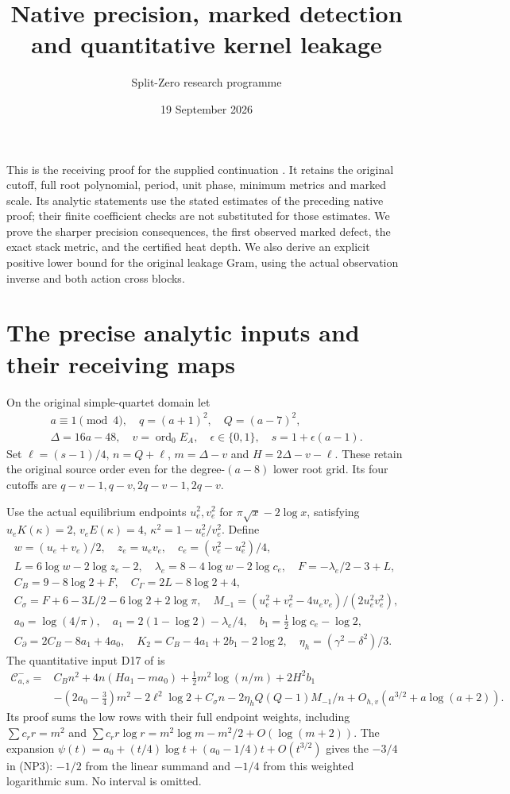 \documentclass[11pt]{article}
\title{Native precision, marked detection and quantitative kernel leakage}
\author{Split-Zero research programme}
\date{19 September 2026}
\begin{document}
\maketitle
This is the receiving proof for the supplied continuation
\cite{incoming}. It retains the original cutoff, full root polynomial,
period, unit phase, minimum metrics and marked scale. Its analytic
statements use the stated estimates of the preceding native proof;
their finite coefficient checks are not substituted for those estimates.
We prove the sharper precision consequences, the first observed marked
defect, the exact stack metric, and the certified heat depth. We also
derive an explicit positive lower bound for the original leakage Gram,
using the actual observation inverse and both action cross blocks.

\section{The precise analytic inputs and their receiving maps}
On the original simple-quartet domain let
\[
\begin{gathered}
 a\equiv1\pmod4,\quad q=(a+1)^2,\quad Q=(a-7)^2,\\
 \Delta=16a-48,\quad v=\operatorname{ord}_0E_A,
 \quad \epsilon\in\{0,1\},\quad s=1+\epsilon(a-1).
\end{gathered}
 \tag{NP1}
\]
Set $\ell=(s-1)/4$, $n=Q+\ell$, $m=\Delta-v$ and
$H=2\Delta-v-\ell$. These retain the original source order even
for the degree-$(a-8)$ lower root grid. Its four cutoffs are
$q-v-1,q-v,2q-v-1,2q-v$.

Use the actual equilibrium endpoints $u_e^2,v_e^2$ for
$\pi\sqrt{x}-2\log x$, satisfying $u_eK(\kappa)=2$,
$v_eE(\kappa)=4$, $\kappa^2=1-u_e^2/v_e^2$. Define
\[
\begin{gathered}
 w=(u_e+v_e)/2,\quad z_e=u_ev_e,\quad c_e=(v_e^2-u_e^2)/4,\\
 L=6\log w-2\log z_e-2,\quad
 \lambda_e=8-4\log w-2\log c_e,\quad F=-\lambda_e/2-3+L,\\
 C_B=9-8\log2+F,\quad C_\Gamma=2L-8\log2+4,\\
 C_\sigma=F+6-3L/2-6\log2+2\log\pi,\quad
 M_{-1}=(u_e^2+v_e^2-4u_ev_e)/(2u_e^2v_e^2),\\
 a_0=\log(4/\pi),\quad a_1=2(1-\log2)-\lambda_e/4,
 \quad b_1=\tfrac12\log c_e-\log2,\\
 C_\partial=2C_B-8a_1+4a_0,\quad
 K_2=C_B-4a_1+2b_1-2\log2,\quad
 \eta_h=(\gamma^2-\delta^2)/3.
\end{gathered}\tag{NP2}
\]
The quantitative input D17 of \cite{native} is
\[
\begin{aligned}
\mathcal C^-_{a,s}={}&C_Bn^2+4n(Ha_1-ma_0)
+\tfrac12m^2\log(n/m)+2H^2b_1\\
&-(2a_0-\tfrac34)m^2-2\ell^2\log2+C_\sigma n
-2\eta_h Q(Q-1)M_{-1}/n+O_{h,v}(a^{3/2}+a\log(a+2)).
\end{aligned}\tag{NP3}
\]
Its proof sums the low rows with their full endpoint weights, including
$\sum c_rr=m^2$ and
$\sum c_rr\log r=m^2\log m-m^2/2+O(\log(m+2))$.
The expansion $\psi(t)=a_0+(t/4)\log t+(a_0-1/4)t+O(t^{3/2})$
gives the $-3/4$ in (NP3): $-1/2$ from the linear summand and
$-1/4$ from this weighted logarithmic sum. No interval is omitted.
\end{document}
